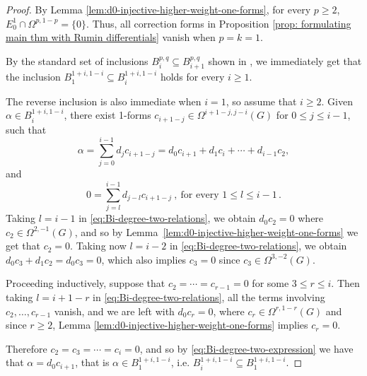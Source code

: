 \documentclass[dvipsnames]{amsart}
\theoremstyle{definition}
\theoremstyle{definition}
\numberwithin{equation}{section}
\begin{document}
\begin{proof} 
By Lemma \ref{lem:d0-injective-higher-weight-one-forms}, for every $p \geq 2$, $E_0^1 \cap \Omega^{p,1-p} = \{0\}$. Thus, all correction forms in Proposition \ref{prop: formulating main thm with Rumin differentials} vanish when $p=k=1$.

By the standard set of inclusions $B_i^{p,q}\subseteq B_{i+1}^{p,q}$ shown in \cite[Lemma 4.1]{tripaldi2026spectralcomplexestruncatedmulticomplexes}, we immediately get that the inclusion $B_1^{1+i,1-i}\subseteq B_i^{1+i,1-i}$ holds for every $i\ge 1$.

The reverse inclusion is also immediate when \(i=1\), so assume that \(i\geq2\). Given $\alpha\in B_i^{1+i,1-i}$, there exist 1-forms $c_{i+1-j}\in\Omega^{i+1-j,j-i}(G)$ for $0\le j\le i-1$, such that
\begin{equation}\label{eq:Bi-degree-two-expression}
\alpha
=
\sum_{j=0}^{i-1}d_jc_{i+1-j}
=
d_0c_{i+1}+d_1c_i+\cdots+d_{i-1}c_2,
\end{equation}
and
\begin{equation}\label{eq:Bi-degree-two-relations}
0
=
\sum_{j=l}^{i-1}d_{j-l}c_{i+1-j}\ ,
\
\text{for every }1\leq l\leq i-1\,.
\end{equation}
Taking $l=i-1$ in
\eqref{eq:Bi-degree-two-relations}, we obtain $d_0c_2=0$ where $c_2\in\Omega^{2,-1}(G)$, and so by
Lemma~\ref{lem:d0-injective-higher-weight-one-forms} we get that $c_2=0$.
Taking now $l=i-2$ in \eqref{eq:Bi-degree-two-relations}, we obtain $d_0c_3+d_1c_2=d_0c_3=0$, which also implies $c_3=0$ since $c_3\in\Omega^{3,-2}(G)$.

Proceeding inductively, suppose that $c_2=\cdots=c_{r-1}=0$ for some $3\le r\le i$. Then taking $l=i+1-r$ in 
\eqref{eq:Bi-degree-two-relations}, all the terms involving $c_2,\ldots,c_{r-1}$ vanish, and we are left with $d_0c_r=0$, where $c_r\in\Omega^{r,1-r}(G)$ and since $r\ge 2$, Lemma \ref{lem:d0-injective-higher-weight-one-forms} implies $c_r=0$. 

Therefore $c_2=c_3=\cdots=c_i=0$, and so by \eqref{eq:Bi-degree-two-expression} we have that $\alpha=d_0c_{i+1}$, that is $\alpha\in  B_1^{1+i,1-i}$, i.e. $B_i^{1+i,1-i}\subseteq B_1^{1+i,1-i}$.
\end{proof}
\end{document}
